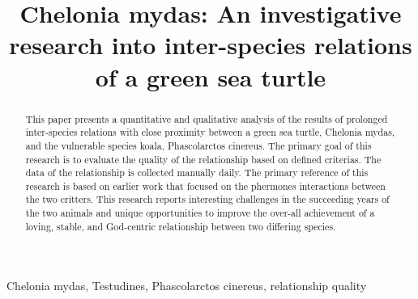 \documentclass[conference]{IEEEtran}
\begin{document}
%
\title{Chelonia mydas: An investigative research into inter-species relations of a green sea turtle}

\author{

}

\maketitle


\begin{abstract}
This paper presents a quantitative and qualitative analysis of the results of prolonged inter-species relations with close proximity between a green sea turtle, Chelonia mydas, and the vulnerable species koala, Phascolarctos cinereus. The primary goal of this research is to evaluate the quality of the relationship based on defined criterias. The data of the relationship is collected manually daily. The primary reference of this research is based on earlier work that focused on the phermones interactions between the two critters. This research reports interesting challenges in the succeeding years of the two animals and unique opportunities to improve the over-all achievement of a loving, stable, and God-centric relationship between two differing species.
\end{abstract}

\begin{IEEEkeywords}
Chelonia mydas, Testudines, Phascolarctos cinereus, relationship quality
\end{IEEEkeywords}
\end{document}
